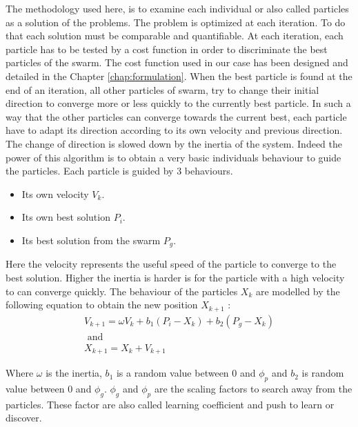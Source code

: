 The methodology used here, is to examine each individual or also called particles as a solution of the problems. The problem is optimized at each iteration. To do that each solution must be comparable and quantifiable. At each iteration, each particle has to be tested by a cost function in order to discriminate the best particles of the swarm. The cost function used in our case has been designed and detailed in the Chapter \ref{chap:formulation}.
When the best particle is found at the end of an iteration, all other particles of swarm,
 try to change their initial direction to converge more or less quickly to the currently best particle. 
In such a way that the other particles can converge towards the current best, each particle have to adapt its direction according to its own velocity and  previous direction. The change of direction is slowed down by the inertia of the system. 
Indeed the power of this algorithm is to obtain a very basic individuals behaviour to guide the particles. 
Each particle is guided by 3 behaviours.
 \begin{itemize}
 \item  Its own velocity $V_k$. 
 \item  Its own best solution $P_i$.
 \item  Its best solution from the swarm $P_g$.
\end{itemize}  
Here the velocity represents the useful speed of the particle to converge to the best solution. 
Higher the inertia is harder is for the particle with a high velocity to can converge quickly.
The behaviour of the particles $X_k$ are modelled by the following equation to obtain the new position $X_{k+1}$ :
\begin{equation} \label{eq:PSO}
\begin{split}
 V_{k+1}= \omega V_k +b_1(P_i -X_k)+b_2(P_g-X_k)
\\
\mbox{ and } \\ X_{k+1}=X_k+V_{k+1}
\end{split}
\end{equation}

Where $\omega$ is the inertia, $b_1$ is a random value between 0 and $\phi_p$ and $b_2$ is random value between 0 and $\phi_g$. $\phi_g$ and $\phi_p$  are the scaling factors to search away from the particles. These factor are also called learning coefficient and push to learn or discover.%

